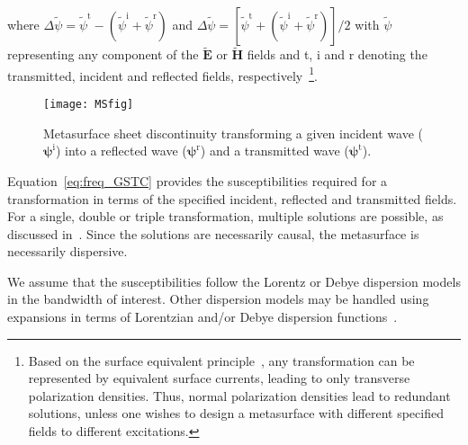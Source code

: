 \documentclass[journal]{IEEEtran}
\newcommand{\ve}[1]{\boldsymbol{#1}}
\begin{document}
%
where $\Delta \tilde{\psi}=\tilde{\psi}^\textrm{t}-\left(\tilde{\psi}^\textrm{i}+\tilde{\psi}^\textrm{r}\right)$ and $\Delta \tilde{\psi}=[\tilde{\psi}^\textrm{t}+\left(\tilde{\psi}^\textrm{i}+\tilde{\psi}^\textrm{r}\right)]/2$ with $\tilde{\psi}$ representing any component of the $\tilde{\ve{E}}$ or $\tilde{\ve{H}}$ fields and t, i and r denoting the transmitted, incident and reflected fields, respectively~\footnote{Based on the surface equivalent principle~\cite{Ishimaru_EM_Radia_Propag_Book1991}, any transformation can be represented by equivalent surface currents, leading to only transverse polarization densities. Thus, normal polarization densities lead to redundant solutions, unless one wishes to design a metasurface with different specified fields to different excitations.}.

\begin{figure}[!ht]
\centering
\texttt{[image: MSfig]}
\caption{Metasurface sheet discontinuity transforming a given incident wave ($\ve{\psi}^\textrm{i}$) into a reflected wave ($\ve{\psi}^\textrm{r}$) and a transmitted wave ($\ve{\psi}^\textrm{t}$).}
\label{fig:ms}
\end{figure}

Equation~\eqref{eq:freq_GSTC} provides the susceptibilities required for a transformation in terms of the specified incident, reflected and transmitted fields. For a single, double or triple transformation, multiple solutions are possible, as discussed in~\cite{Karim_ms_suscp_syn_2015}. Since the solutions are necessarily causal, the metasurface is necessarily dispersive.

We assume that the susceptibilities follow the Lorentz or Debye dispersion models in the bandwidth of interest. Other dispersion models may be handled using expansions in terms of Lorentzian and/or Debye dispersion functions~\cite{VECTFIT_code2002,VECTFIT_method1999}.
\end{document}

